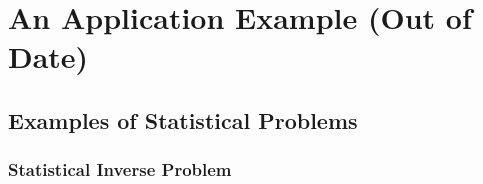 \chapter{An Application Example (Out of Date)}\label{ch-appl-example}
\thispagestyle{headings}



\clearpage
\section{Examples of Statistical Problems}

\subsection{Statistical Inverse Problem}

